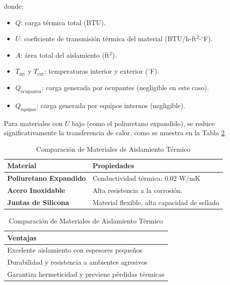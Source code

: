 \documentclass[11pt,a4paper]{article}
\begin{document}
\begin{multicols}{2}
	donde:
	\begin{itemize}[itemsep=0.25em, topsep=0.25em, partopsep=0pt]
		\item $Q$: carga térmica total (BTU).
		\item $U$: coeficiente de transmisión térmica del material (BTU/h-ft$^2$-$^\circ$F).
		\item $A$: área total del aislamiento (ft$^2$).
		\item $T_{\text{int}}$ y $T_{\text{ext}}$: temperaturas interior y exterior ($^\circ$F).
		\item $Q_{\text{ocupantes}}$: carga generada por ocupantes (negligible en este caso).
		\item $Q_{\text{equipos}}$: carga generada por equipos internos (negligible).
	\end{itemize}
	
	Para materiales con $U$ bajo (como el poliuretano expandido), se reduce significativamente la transferencia de calor, como se muestra en la Tabla \ref{tab:materiales}.
	
 	
	
\begin{table}[H]
	\centering
	\caption{Comparación de Materiales de Aislamiento Térmico} 
	\label{tab:materiales}
\begin{tabular}{|p{2cm}|p{4cm}|}
	\hline
	\textbf{Material} & \textbf{Propiedades} \\ \hline
	\textbf{Poliuretano Expandido} & Conductividad térmica: 0.02 W/mK \\ \hline
	\textbf{Acero Inoxidable} & Alta resistencia a la corrosión. \\ \hline
	\textbf{Juntas de Silicona} & Material flexible, alta capacidad de sellado \\ \hline
\end{tabular}
	\vspace{0.11cm} %
	
	\begin{tabular}{|l|}
		\hline
		\textbf{Ventajas} \\ \hline
		Excelente aislamiento con espesores pequeños \\ \hline
		Durabilidad y resistencia a ambientes agresivos \\ \hline
		Garantiza hermeticidad y previene pérdidas térmicas \\ \hline
	\end{tabular}
\end{table}





\end{multicols}
\end{document}
